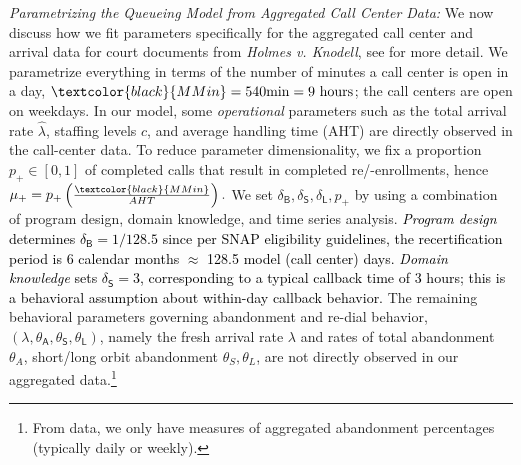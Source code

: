 \documentclass[manuscript,screen,authorversion]{acmart}
\newcommand{\rev}[1]{\textcolor{black}{#1}}
\begin{document}
\textit{Parametrizing the Queueing Model from Aggregated Call Center Data: }We now discuss how we fit parameters specifically for the aggregated call center and arrival data for court documents from \textit{Holmes v. Knodell}, see  for more detail. %
We parametrize everything in terms of the number of minutes a call center is open in a day, $\rev{MMin}=540 \text{min}=9 \text{ hours}$; the call centers are open on weekdays. In our model, some \textit{operational} parameters such as the total arrival rate $\hat{\lambda}$, staffing levels $c$, and average handling time (AHT) are directly observed in the call-center data. %
To reduce parameter dimensionality, we fix a proportion $p_+\in[0,1]$ of completed calls that result in completed re/-enrollments, hence $\mu_{\mathsf{+}} = p_+ \left( \frac{\rev{MMin}}{AHT} \right).$ %
We set $\delta_{\mathsf{B}},\delta_{\mathsf{S}},\delta_{\mathsf{L}},p_+$ by using a combination of program design, domain knowledge, and time series analysis. \rev{\textit{Program design} determines $\delta_{\mathsf{B}} = 1/128.5$ since per SNAP eligibility guidelines, the recertification period is 6 calendar months $\approx$ 128.5 model (call center) days. %
\textit{Domain knowledge} sets $\delta_{\mathsf{S}}=3$, corresponding to a typical callback time of $3$ hours; this is a behavioral assumption about within-day callback behavior.} %
The remaining behavioral parameters governing abandonment and re-dial behavior, $(\lambda,\theta_{\mathsf{A}},\theta_{\mathsf{S}},\theta_{\mathsf{L}})$, namely the fresh arrival rate $\lambda$ and rates of total abandonment $\theta_A$, short/long orbit abandonment $\theta_S,\theta_L$, are not directly observed in our aggregated data.\footnote{From data, we only have measures of aggregated abandonment percentages (typically daily or weekly).}
\end{document}

